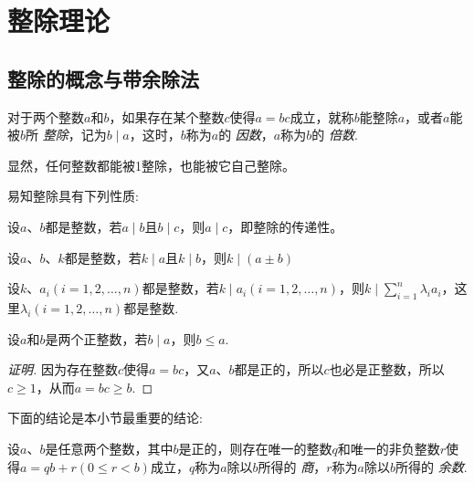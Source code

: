 
\section{整除理论}
\label{sec:integer-division}

\subsection{整除的概念与带余除法}
\label{sec:concept-of-integer-indivision-and-devision-with-remainder}

\begin{definition}
  对于两个整数$a$和$b$，如果存在某个整数$c$使得$a=bc$成立，就称$b$能整除$a$，或者$a$能被$b$所 \emph{整除}，记为$b \mid a$，这时，$b$称为$a$的 \emph{因数}，$a$称为$b$的 \emph{倍数}.
\end{definition}

显然，任何整数都能被1整除，也能被它自己整除。

易知整除具有下列性质:
\begin{property}
  设$a$、$b$都是整数，若$a \mid b$且$b \mid c$，则$a \mid c$，即整除的传递性。
\end{property}

\begin{property}
  设$a$、$b$、$k$都是整数，若$k \mid a$且$k \mid b$，则$k \mid (a \pm b)$
\end{property}

\begin{property}
  设$k$、$a_i(i=1,2,\ldots,n)$都是整数，若$k \mid a_i(i=1,2,\ldots,n)$，则$k \mid \sum_{i=1}^n \lambda_i a_i$，这里$\lambda_i(i=1,2,\ldots,n)$都是整数.
\end{property}

\begin{property}
  \label{property:b-mid-a-to-b-leqslant-a}
  设$a$和$b$是两个正整数，若$b \mid a$，则$b \leqslant a$.
\end{property}

\begin{proof}[证明]
  因为存在整数$c$使得$a=bc$，又$a$、$b$都是正的，所以$c$也必是正整数，所以$c \geqslant 1$，从而$a=bc \geqslant b$.
\end{proof}

下面的结论是本小节最重要的结论:
\begin{theorem}[带余除法]
  设$a$、$b$是任意两个整数，其中$b$是正的，则存在唯一的整数$q$和唯一的非负整数$r$使得$a=qb+r(0 \leqslant r < b)$成立，$q$称为$a$除以$b$所得的 \emph{商}，$r$称为$a$除以$b$所得的 \emph{余数}.
\end{theorem}

